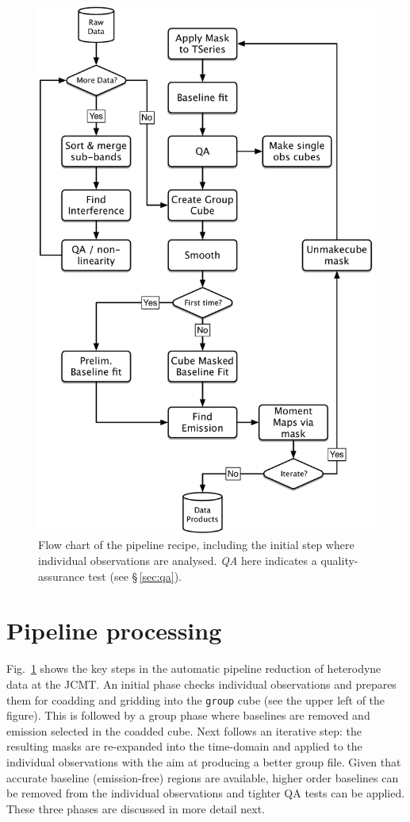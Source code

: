 \documentclass[a4paper,fleqn,usenatbib]{mnras}
\begin{document}
\begin{figure}
\includegraphics[width=\columnwidth]{flowchart}
\caption{Flow chart of the pipeline recipe, including the initial step
  where individual observations are analysed. \emph{QA} here indicates
  a quality-assurance test (see \S\,\ref{sec:qa}).
}
\label{fig:flowchart}
\end{figure}

\section{Pipeline processing}

Fig.~\ref{fig:flowchart} shows the key steps in the automatic
pipeline reduction of heterodyne data at the JCMT. An initial phase
checks individual observations and prepares them for coadding and
gridding into the \texttt{group} cube (see the upper left of the figure).
This is followed by a group
phase where baselines are removed and emission selected in the coadded
cube.  Next follows an iterative step: the resulting masks are
re-expanded into the time-domain and applied to the individual
observations with the aim at producing a better group file. Given that
accurate baseline (emission-free) regions are available, higher
order baselines can be removed from the individual observations and
tighter QA tests can be applied. These three phases are discussed in
more detail next.
\end{document}
